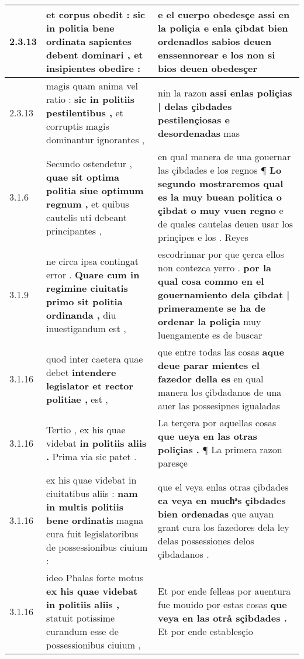 \begin{tabular}{|p{1cm}|p{6.5cm}|p{6.5cm}|}
2.3.13 & et corpus obedit : \textbf{ sic in politia bene ordinata sapientes debent dominari , } et insipientes obedire : & e el cuerpo obedesçe assi en la poliçia \textbf{ e enla çibdat bien ordenadlos sabios deuen enssennorear } e los non si bios deuen obedesçer \\\hline
2.3.13 & magis quam anima vel ratio : \textbf{ sic in politiis pestilentibus , } et corruptis magis dominantur ignorantes , & nin la razon \textbf{ assi enlas poliçias | delas çibdades pestilençiosas e desordenadas } mas \\\hline
3.1.6 & Secundo ostendetur , \textbf{ quae sit optima politia siue optimum regnum , } et quibus cautelis uti debeant principantes , & en qual manera de una gouernar las çibdades e los regnos ¶ \textbf{ Lo segundo mostraremos qual es la muy buean politica o çibdat o muy vuen regno } e de quales cautelas deuen usar los prinçipes e los . Reyes \\\hline
3.1.9 & ne circa ipsa contingat error . \textbf{ Quare cum in regimine ciuitatis primo sit politia ordinanda , } diu inuestigandum est , & escodrinnar por que çerca ellos non contezca yerro . \textbf{ por la qual cosa commo en el gouernamiento dela çibdat | primeramente se ha de ordenar la poliçia } muy luengamente es de buscar \\\hline
3.1.16 & quod inter caetera quae debet \textbf{ intendere legislator et rector politiae , } est , & que entre todas las cosas \textbf{ aque deue parar mientes el fazedor della es } en qual manera los çibdadanos de una auer las possesipnes igualadas \\\hline
3.1.16 & Tertio , ex his quae videbat \textbf{ in politiis aliis . } Prima via sic patet . & La terçera por aquellas cosas \textbf{ que ueya en las otras poliçias . } ¶ La primera razon paresçe \\\hline
3.1.16 & ex his quae videbat in ciuitatibus aliis : \textbf{ nam in multis politiis bene ordinatis } magna cura fuit legislatoribus de possessionibus ciuium : & que el veya enlas otras çibdades \textbf{ ca veya en muchͣs çibdades bien ordenadas } que auyan grant cura los fazedores dela ley delas possessiones delos çibdadanos . \\\hline
3.1.16 & ideo Phalas forte motus \textbf{ ex his quae videbat in politiis aliis , } statuit potissime curandum esse de possessionibus ciuium , & Et por ende felleas por auentura fue mouido por estas cosas \textbf{ que veya en las otrå sçibdades . } Et por ende establesçio \\\hline

\end{tabular}
